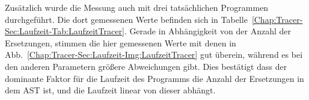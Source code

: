 Zusätzlich wurde die Messung auch mit drei tatsächlichen Programmen 
durchgeführt. Die dort gemessenen Werte befinden sich in 
Tabelle~\ref{Chap:Tracer-Sec:Laufzeit-Tab:LaufzeitTracer}. Gerade in 
Abhängigkeit von der Anzahl der Ersetzungen, stimmen die hier gemessenen Werte
mit denen in Abb.~\ref{Chap:Tracer-Sec:Laufzeit-Img:LaufzeitTracer} gut 
überein, während es bei den anderen Parametern größere Abweichungen gibt.
Dies bestätigt dass der dominante Faktor für die Laufzeit des Programms 
die Anzahl der Ersetzungen in dem AST ist, und die Laufzeit linear von dieser 
abhängt.


